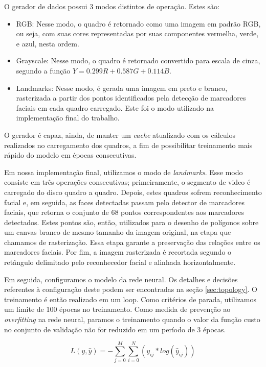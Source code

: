 O gerador de dados possui 3 modos distintos de operação. Estes são:
\begin{itemize}
    \item RGB: Nesse modo, o quadro é retornado como uma imagem em padrão RGB, ou seja, com suas cores representadas por suas componentes vermelha, verde, e azul, nesta ordem.
    \item Grayscale: Nesse modo, o quadro é retornado convertido para escala de cinza, segundo a função $Y = 0.299 R + 0.587 G + 0.114 B$.
    \item Landmarks: Nesse modo, é gerada uma imagem em preto e branco, rasterizada a partir dos pontos identificados pela detecção de marcadores faciais em cada quadro carregado. Este foi o modo utilizado na implementação final do trabalho.
\end{itemize}
O gerador é capaz, ainda, de manter um \textit{cache} atualizado com os cálculos realizados no carregamento dos quadros, a fim de possibilitar treinamento mais rápido do modelo em épocas consecutivas.

Em nossa implementação final, utilizamos o modo de \textit{landmarks}. Esse modo consiste em três operações consecutivas; primeiramente, o segmento de video é carregado do disco quadro a quadro. Depois, estes quadros sofrem reconhecimento facial e, em seguida, as faces detectadas passam pelo detector de marcadores faciais, que retorna o conjunto de 68 pontos correspondentes aos marcadores detectados. Estes pontos são, então, utilizados para o desenho de polígonos sobre um canvas branco de mesmo tamanho da imagem original, na etapa que chamamos de rasterização. Essa etapa garante a preservação das relações entre os marcadores faciais. Por fim, a imagem rasterizada é recortada segundo o retângulo delimitado pelo reconhecedor facial e alinhada horizontalmente.

Em seguida, configuramos o modelo da rede neural. Os detalhes e decisões referentes à configuração deste podem ser encontradas na seção \ref{sec:topology}. O treinamento é então realizado em um loop. Como critérios de parada, utilizamos um limite de 100 épocas no treinamento. Como medida de prevenção ao \textit{overfitting} na rede neural, paramos o treinamento quando o valor da função custo no conjunto de validação não for reduzido em um período de 3 épocas.

\begin{equation} \label{eq:categorical_crossentropy}
    L(y,\hat{y})=-\sum\limits_{j=0}^M\sum\limits_{i=0}^N(y_{ij}*log(\hat{y}_{ij}))
\end{equation}

